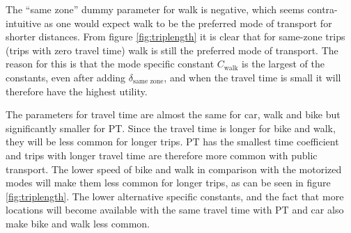 


The ``same zone'' dummy parameter  for walk is negative, which seems contra-intuitive as one would expect walk to be the preferred mode of transport for shorter distances. From figure \ref{fig:triplength} it is clear that for same-zone trips (trips with zero travel time) walk is still the preferred mode of transport. The reason for this is that the mode specific constant $C_{\text{walk}}$ is the largest of the constants, even after adding $\delta_{\text{same zone}}$, and when the travel time is small it will therefore have the highest utility.

The parameters for travel time are almost the same for car, walk and bike but significantly smaller for PT. Since the travel time is longer for bike and walk, they will be less common for longer trips. PT has the smallest time coefficient and trips with longer travel time are therefore more common with public transport. The lower speed of bike and walk in comparison with the motorized modes will make them less common for longer trips, as can be seen in figure \ref{fig:triplength}. The lower alternative specific constants, and the fact that more locations will become available with the same travel time with PT and car also make bike and walk less common.
